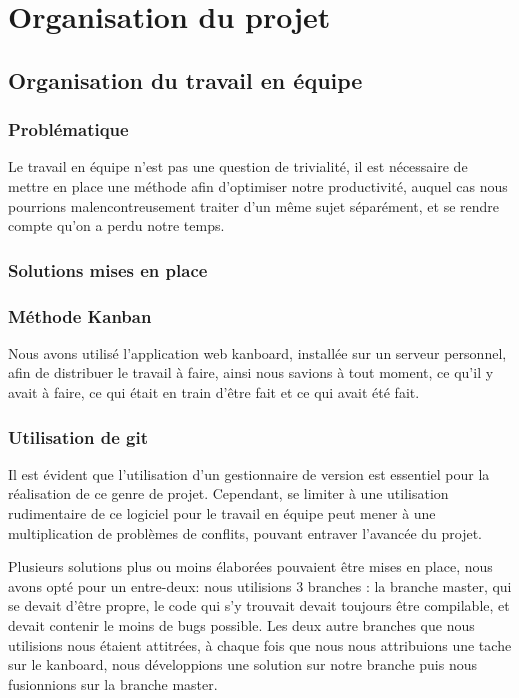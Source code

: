 

\section{Organisation du projet}


\subsection{Organisation du travail en équipe}

\subsubsection*{Problématique}

    Le travail en équipe n'est pas une question de trivialité, il est nécessaire de mettre en
place une méthode afin d'optimiser notre productivité, auquel cas nous pourrions 
malencontreusement traiter d'un même sujet séparément, et se rendre compte qu'on a perdu notre
temps.

\subsubsection*{Solutions mises en place}

\subsubsection*{Méthode Kanban}

    Nous avons utilisé l'application web kanboard, installée sur un serveur personnel, afin de
distribuer le travail à faire, ainsi nous savions à tout moment, ce qu'il y avait à faire,
ce qui était en train d'être fait et ce qui avait été fait. 


\subsubsection*{Utilisation de git}

    Il est évident que l'utilisation d'un gestionnaire de version est essentiel pour la 
réalisation de ce genre de projet. Cependant, se limiter à une utilisation rudimentaire
de ce logiciel pour le travail en équipe peut mener à une multiplication de problèmes de 
conflits, pouvant entraver l'avancée du projet. 

    Plusieurs solutions plus ou moins élaborées pouvaient être mises en place, nous avons opté 
pour un entre-deux: nous utilisions 3 branches : la branche master, qui se devait d'être 
propre, le code qui s'y trouvait devait toujours être
compilable, et devait contenir le moins de bugs possible. Les deux autre branches que nous
utilisions nous étaient attitrées, à chaque fois que nous nous attribuions une tache sur le
kanboard, nous développions une solution sur notre branche puis nous fusionnions sur la branche
master.

